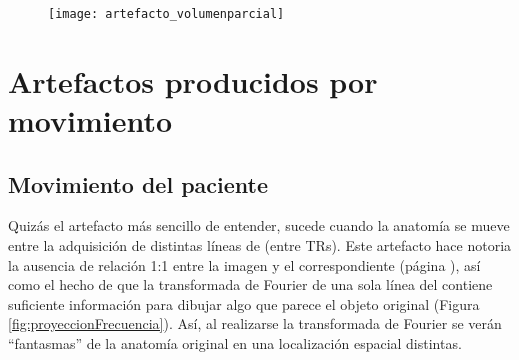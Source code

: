 \begin{figure}[htb]
 \begin{figg}
   \texttt{[image: artefacto\_volumenparcial]}
   \caption{\figurapendiente}
 \label{fig:artefacto_volumenparcial}
 \end{figg}
\end{figure}

\section{Artefactos producidos por movimiento}
\subsection{Movimiento del paciente}
Quizás el artefacto más sencillo de entender, sucede cuando la anatomía se mueve entre la adquisición de distintas líneas de \espaciok (entre TRs). Este artefacto hace notoria la ausencia de relación 1:1 entre la imagen y el \espaciok correspondiente (página \pageref{sec:espaciok}), así como el hecho de que la transformada de Fourier de una sola línea del \espaciok contiene suficiente información para dibujar algo que parece el objeto original (Figura \ref{fig:proyeccionFrecuencia}). Así, al realizarse la transformada de Fourier se verán ``fantasmas'' de la anatomía original en una localización espacial distintas.

